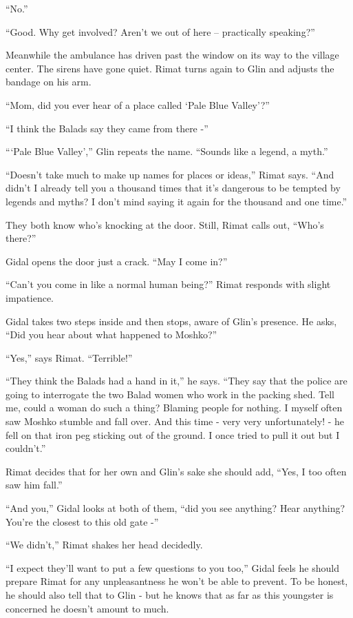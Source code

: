 \documentclass[twoside,11pt]{book}
\begin{document}
``No.''

``Good. Why get involved? Aren't we out of here -- practically speaking?''

Meanwhile the ambulance has driven past the window on its way to the village center. The sirens have gone quiet. Rimat
turns again to Glin and adjusts the bandage on his arm.

``Mom, did you ever hear of a place called `Pale Blue Valley'?''

``I think the Balads say they came from there -''

``\thinspace`Pale Blue Valley','' Glin repeats the name. ``Sounds like a legend, a
myth.''

``Doesn't take much to make up names for places or ideas,'' Rimat says. ``And
didn't I already tell you a thousand times that it's dangerous to be tempted by legends and myths? I don't mind
saying it again for the thousand and one time.''

They both know who's knocking at the door. Still, Rimat calls out, ``Who's there?''

Gidal opens the door just a crack. ``May I come in?''

``Can't you come in like a normal human being?'' Rimat responds with slight
impatience.

Gidal takes two steps inside and then stops, aware of Glin's presence. He asks, ``Did you hear about what
happened to Moshko?''

``Yes,'' says Rimat. ``Terrible!''

``They think the Balads had a hand in it,'' he says. ``They say that the police
are going to interrogate the two Balad women who work in the packing shed. Tell me, could a woman do such a thing?
Blaming people for nothing. I myself often saw Moshko stumble and fall over. And this time - very very unfortunately! -
he fell on that iron peg sticking out of the ground. I once tried to pull it out but I couldn't.''

Rimat decides that for her own and Glin's sake she should add, ``Yes, I too often saw him
fall.''

``And you,'' Gidal looks at both of them, ``did you see anything? Hear anything?
You're the closest to this old gate -''

``We didn't,'' Rimat shakes her head decidedly.

``I expect they'll want to put a few questions to you too,'' Gidal feels he should prepare
Rimat for any unpleasantness he won't be able to prevent. To be honest, he should also tell that to Glin - but he
knows that as far as this youngster is concerned he doesn't amount to much.
\end{document}
